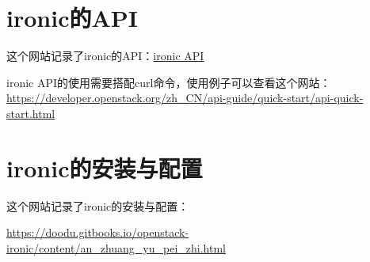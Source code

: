 \documentclass[a4paper,left=2.5cm,right=2.5cm,11pt]{article}
\begin{document}
\section{ironic的API}
	这个网站记录了ironic的API：\href{https://developer.openstack.org/api-ref/baremetal/?expanded=list-api-versions-detail,show-v1-api-detail,create-node-detail,list-nodes-detail,list-nodes-detailed-detail,show-node-details-detail,update-node-detail,delete-node-detail,validate-node-detail,set-maintenance-flag-detail,clear-maintenance-flag-detail,set-boot-device-detail,get-boot-device-detail,get-supported-boot-devices-detail,inject-nmi-non-masking-interrupts-detail,node-state-summary-detail,change-node-power-state-detail,change-node-provision-state-detail,set-raid-config-detail,get-console-detail,start-stop-console-detail,list-methods-detail,call-a-method-detail,list-attached-vifs-of-a-node-detail,attach-a-vif-to-a-node-detail,detach-vif-from-a-node-detail,list-portgroups-detail,create-portgroup-detail,list-detailed-portgroups-detail,show-portgroup-details-detail,update-a-portgroup-detail,delete-portgroup-detail,list-portgroups-by-node-detail,list-detailed-portgroups-by-node-detail,list-ports-detail,create-port-detail,list-detailed-ports-detail,show-port-details-detail,update-a-port-detail,delete-port-detail,list-ports-by-node-detail,list-detailed-ports-by-node-detail,list-ports-by-portgroup-detail,list-detailed-ports-by-portgroup-detail,list-drivers-detail,show-driver-details-detail,show-driver-properties-detail,show-driver-logical-disk-properties-detail,id104-detail,id108-detail,list-chassis-with-details-detail,show-chassis-details-detail,update-chassis-detail,delete-chassis-detail,create-chassis-detail,list-chassis-detail,agent-lookup-detail,agent-heartbeat-detail}{ironic API}\par

	ironic API的使用需要搭配curl命令，使用例子可以查看这个网站：
	\url{https://developer.openstack.org/zh_CN/api-guide/quick-start/api-quick-start.html}

\section{ironic的安装与配置}
	这个网站记录了ironic的安装与配置：\par
	\url{https://doodu.gitbooks.io/openstack-ironic/content/an_zhuang_yu_pei_zhi.html}
\end{document}
